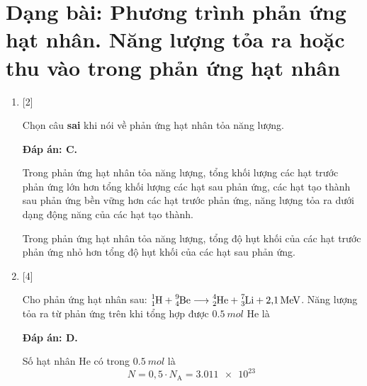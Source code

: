 \section{Dạng bài: Phương trình phản ứng hạt nhân. Năng lượng tỏa ra hoặc thu vào trong phản ứng hạt nhân}
\begin{enumerate}[label=\bfseries Câu \arabic*:]
	\item {} [2]
	
	\cauhoi
	{Chọn câu \textbf{sai} khi nói về phản ứng hạt nhân tỏa năng lượng.
	}
	
	\loigiai
	{		\textbf{Đáp án: C.}
		
		Trong phản ứng hạt nhân tỏa năng lượng, tổng khối lượng các hạt trước phản ứng lớn hơn tổng khối lượng các hạt sau phản ứng, các hạt tạo thành sau phản ứng bền vững hơn các hạt trước phản ứng, năng lượng tỏa ra dưới dạng động năng của các hạt tạo thành.
		
		Trong phản ứng hạt nhân tỏa năng lượng, tổng độ hụt khối của các hạt trước phản ứng nhỏ hơn tổng độ hụt khối của các hạt sau phản ứng.
		
	}
	\item {} [4]
	
	\cauhoi
	{Cho phản ứng hạt nhân sau: $\ce{^1_1 H} + \ce{^9_4 Be} \longrightarrow \ce{^4_2 He} + \ce{^7_3 Li} + \SI{2.1}{MeV}$. Năng lượng tỏa ra từ phản ứng trên khi tổng hợp được $\SI{0.5}{mol}$ He là
	}
	
	\loigiai
	{		\textbf{Đáp án: D.}
		
		Số hạt nhân He có trong $\SI{0.5}{mol}$ là
		$$N=0,5 \cdot N_\text{A} = \SI{3.011e23}{}$$
		
}
\end{enumerate}
